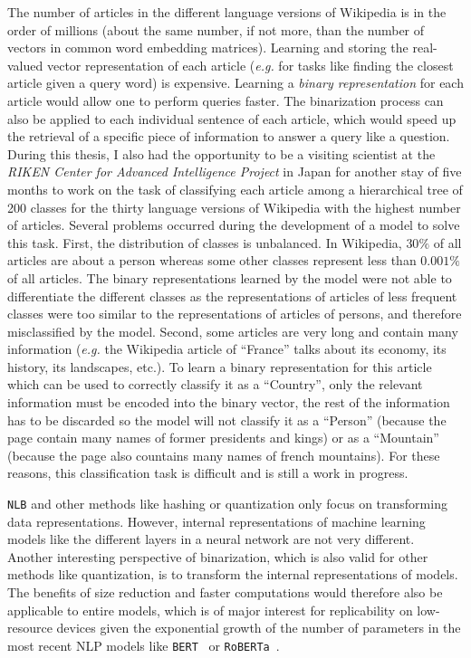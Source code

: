   \noindent The number of articles in the different language versions of
  Wikipedia is in the order of millions (about the same number, if not more,
  than the number of vectors in common word embedding matrices). Learning and
  storing the real-valued vector representation of each article (\textit{e.g.}
  for tasks like finding the closest article given a query word) is expensive.
  Learning a \textit{binary representation} for each article would allow one to
  perform queries faster. The binarization process can also be applied to each
  individual sentence of each article, which would speed up the retrieval of a
  specific piece of information to answer a query like a question. During this
  thesis, I also had the opportunity to be a visiting scientist at the
  \textit{RIKEN Center for Advanced Intelligence Project} in Japan for another
  stay of five months to work on the task of classifying each article among a
  hierarchical tree of 200 classes for the thirty language versions of Wikipedia
  with the highest number of articles. Several problems occurred during the
  development of a model to solve this task. First, the distribution of classes
  is unbalanced. In Wikipedia, $30\%$ of all articles are about a person whereas
  some other classes represent less than $0.001\%$ of all articles. The binary
  representations learned by the model were not able to differentiate the
  different classes as the representations of articles of less frequent classes
  were too similar to the representations of articles of persons, and therefore
  misclassified by the model. Second, some articles are very long and contain
  many information (\textit{e.g.} the Wikipedia article of ``France'' talks
  about its economy, its history, its landscapes, etc.). To learn a binary
  representation for this article which can be used to correctly classify it as
  a ``Country'', only the relevant information must be encoded into the binary
  vector, the rest of the information has to be discarded so the model will not
  classify it as a ``Person'' (because the page contain many names of former
  presidents and kings) or as a ``Mountain'' (because the page also countains
  many names of french mountains). For these reasons, this classification task
  is difficult and is still a work in progress.

  \medskip
  \texttt{NLB} and other methods like hashing or quantization only focus on
  transforming data representations. However, internal representations of
  machine learning models like the different layers in a neural network are not
  very different. Another interesting perspective of binarization, which is also
  valid for other methods like quantization, is to transform the internal
  representations of models. The benefits of size reduction and faster
  computations would therefore also be applicable to entire models, which is of
  major interest for replicability on low-resource devices given the exponential
  growth of the number of parameters in the most recent NLP models like
  \texttt{BERT}~\citep{devlin2019bert} or
  \texttt{RoBERTa}~\citep{liu2019roberta}.
